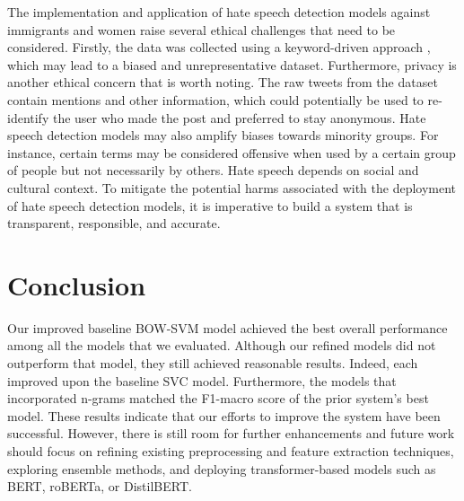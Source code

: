 \documentclass[11pt,a4paper]{article}
\begin{document}
   The implementation and application of hate speech detection models against immigrants and women raise several ethical challenges that need to be considered. Firstly, the data was collected using a keyword-driven approach \citep{basile-etal-2019-semeval}, which may lead to a biased and unrepresentative dataset. Furthermore, privacy is another ethical concern that is worth noting. The raw tweets from the dataset contain mentions and other information, which could potentially be used to re-identify the user who made the post and preferred to stay anonymous. Hate speech detection models may also amplify biases towards minority groups. For instance, certain terms may be considered offensive when used by a certain group of people but not necessarily by others. Hate speech depends on social and cultural context. To mitigate the potential harms associated with the deployment of hate speech detection models, it is imperative to build a system that is transparent, responsible, and accurate.




\section{Conclusion}
 Our improved baseline BOW-SVM model achieved the best overall performance among all the models that we evaluated. Although our refined models did not outperform that model, they still achieved reasonable results. Indeed, each improved upon the \citet{basile-etal-2019-semeval} baseline SVC model. Furthermore, the models that incorporated n-grams matched the F1-macro score of the prior system’s best 
model. These results indicate that our efforts to improve the system have been successful. However, there is still room for further enhancements and future work should focus on refining existing preprocessing and feature extraction techniques, exploring ensemble methods, and deploying transformer-based models such as BERT, roBERTa, or DistilBERT.


\nocite{*}


\end{document}
